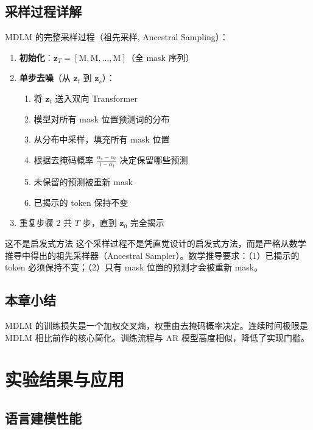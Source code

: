 \documentclass[a4paper]{article}
\begin{document}
\subsection{采样过程详解}

MDLM 的完整采样过程（祖先采样, Ancestral Sampling）：

\begin{enumerate}
    \item \textbf{初始化}：$\mathbf{z}_T = [\text{M}, \text{M}, \ldots, \text{M}]$（全 mask 序列）
    \item \textbf{单步去噪}（从 $\mathbf{z}_t$ 到 $\mathbf{z}_s$）：
    \begin{enumerate}
        \item 将 $\mathbf{z}_t$ 送入双向 Transformer
        \item 模型对所有 mask 位置预测词的分布
        \item 从分布中采样，填充所有 mask 位置
        \item 根据去掩码概率 $\frac{\alpha_s - \alpha_t}{1 - \alpha_t}$ 决定保留哪些预测
        \item 未保留的预测被重新 mask
        \item 已揭示的 token 保持不变
    \end{enumerate}
    \item 重复步骤 2 共 $T$ 步，直到 $\mathbf{z}_0$ 完全揭示
\end{enumerate}

\begin{warningbox}{这不是启发式方法}
这个采样过程不是凭直觉设计的启发式方法，而是严格从数学推导中得出的祖先采样器（Ancestral Sampler）。数学推导要求：（1）已揭示的 token 必须保持不变；（2）只有 mask 位置的预测才会被重新 mask。
\end{warningbox}

\subsection{本章小结}

MDLM 的训练损失是一个加权交叉熵，权重由去掩码概率决定。连续时间极限是 MDLM 相比前作的核心简化。训练流程与 AR 模型高度相似，降低了实现门槛。

\newpage
\section{实验结果与应用}

\subsection{语言建模性能}
\end{document}
